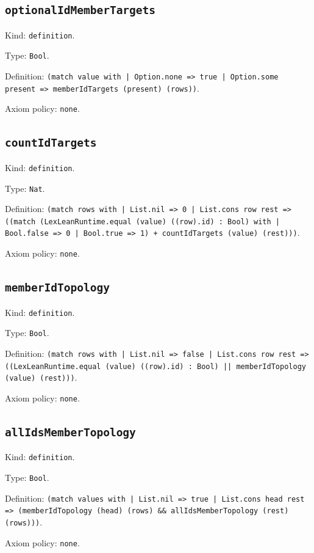 \documentclass[11pt]{article}
\begin{document}
\subsection*{\texttt{optionalIdMemberTargets}}
\noindent Kind: \texttt{definition}.\par
\noindent Type: \texttt{Bool}.\par
\noindent Definition: \texttt{(match value with | Option.none => true | Option.some present => memberIdTargets (present) (rows))}.\par
\noindent Axiom policy: \texttt{none}.\par
\subsection*{\texttt{countIdTargets}}
\noindent Kind: \texttt{definition}.\par
\noindent Type: \texttt{Nat}.\par
\noindent Definition: \texttt{(match rows with | List.nil => 0 | List.cons row rest => ((match (LexLeanRuntime.equal (value) ((row).id) : Bool) with | Bool.false => 0 | Bool.true => 1) + countIdTargets (value) (rest)))}.\par
\noindent Axiom policy: \texttt{none}.\par
\subsection*{\texttt{memberIdTopology}}
\noindent Kind: \texttt{definition}.\par
\noindent Type: \texttt{Bool}.\par
\noindent Definition: \texttt{(match rows with | List.nil => false | List.cons row rest => ((LexLeanRuntime.equal (value) ((row).id) : Bool) || memberIdTopology (value) (rest)))}.\par
\noindent Axiom policy: \texttt{none}.\par
\subsection*{\texttt{allIdsMemberTopology}}
\noindent Kind: \texttt{definition}.\par
\noindent Type: \texttt{Bool}.\par
\noindent Definition: \texttt{(match values with | List.nil => true | List.cons head rest => (memberIdTopology (head) (rows) \&\& allIdsMemberTopology (rest) (rows)))}.\par
\noindent Axiom policy: \texttt{none}.\par
\end{document}
